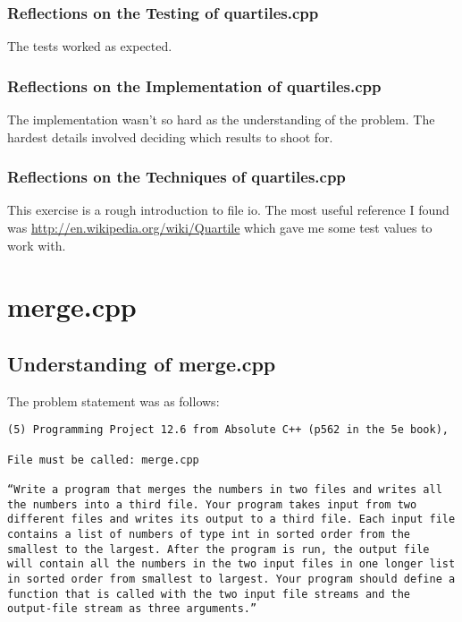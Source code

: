\documentclass[11pt, oneside]{memoir}
\begin{document}
\subsubsection{Reflections on the Testing of quartiles.cpp}

The tests worked as expected.


\subsubsection{Reflections on the Implementation of quartiles.cpp}

The implementation wasn't so hard as the understanding of the
problem.   The hardest details involved deciding which results to
shoot for. 


\subsubsection{Reflections on the Techniques of quartiles.cpp}

This exercise is a rough introduction to file io.  The most useful
reference I found was \url{http://en.wikipedia.org/wiki/Quartile}
which gave me some test values to work with.


\section{merge.cpp}

\subsection{Understanding of merge.cpp}

The problem statement was as follows:

\begin{verbatim}
(5) Programming Project 12.6 from Absolute C++ (p562 in the 5e book), 

File must be called: merge.cpp

“Write a program that merges the numbers in two files and writes all
the numbers into a third file. Your program takes input from two
different files and writes its output to a third file. Each input file
contains a list of numbers of type int in sorted order from the
smallest to the largest. After the program is run, the output file
will contain all the numbers in the two input files in one longer list
in sorted order from smallest to largest. Your program should define a
function that is called with the two input file streams and the
output-file stream as three arguments.”
\end{verbatim}
\end{document}
